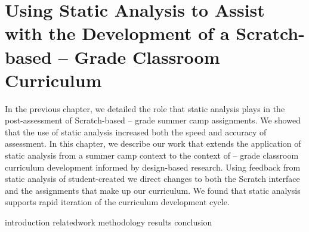 \chapter{Using Static Analysis to Assist with the Development of a
  Scratch-based -- Grade Classroom Curriculum}
\label{chap:curriculum}

\def\currentprefix{curriculum}

In the previous chapter, we detailed the role that static analysis plays in the
post-assessment of Scratch-based -- grade summer camp
assignments. We showed that the use of static analysis increased both the speed
and accuracy of assessment. In this chapter, we describe our work that extends
the application of static analysis from a summer camp context to the context of
-- grade classroom curriculum development informed by
design-based research. Using feedback from static analysis of student-created
 we direct changes to both the Scratch interface and the
assignments that make up our curriculum. We found that static analysis supports
rapid iteration of the curriculum development cycle.

\iffull
{introduction}
{relatedwork}
{methodology}
{results}
{conclusion}
\fi
